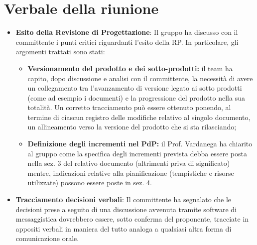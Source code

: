 \section{Verbale della riunione}
	\begin{itemize}
		\item \textbf{Esito della Revisione di Progettazione}: Il gruppo ha discusso con il committente i punti critici riguardanti l'esito della RP. In particolare, gli argomenti trattati sono stati:
		\begin{itemize}
			\item \textbf{Versionamento del prodotto e dei sotto-prodotti:} il team ha capito, dopo discussione e analisi con il committente, la necessità di avere un collegamento tra l'avanzamento di versione legato ai sotto prodotti (come ad esempio i documenti) e la progressione del prodotto nella sua totalità. Un corretto tracciamento può essere ottenuto ponendo, al termine di ciascun registro delle modifiche relativo al singolo documento, un allineamento verso la versione del prodotto che si sta rilasciando;
			\item \textbf{Definizione degli incrementi nel PdP:} il Prof. Vardanega ha chiarito al gruppo come la specifica degli incrementi prevista debba essere posta nella sez. 3 del relativo documento (altrimenti priva di significato) mentre, indicazioni relative alla pianificazione (tempistiche e risorse utilizzate) possono essere poste in sez. 4.
		\end{itemize}
		\item \textbf{Tracciamento decisioni verbali}: Il committente ha segnalato che le decisioni prese a seguito di una discussione avvenuta tramite software di messaggistica dovrebbero essere, sotto conferma del proponente, tracciate in appositi verbali in maniera del tutto analoga a qualsiasi altra forma di comunicazione orale. 
	\end{itemize}

